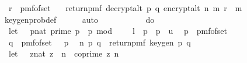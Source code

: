 \begin{isabellebody}
\ \ r\ {\isasymleftarrow}\ pmf{\isacharunderscore}{\kern0pt}of{\isacharunderscore}{\kern0pt}set\ {\isasymZ}{\isacharsemicolon}{\kern0pt}\isanewline
\ \ return{\isacharunderscore}{\kern0pt}pmf\ {\isacharparenleft}{\kern0pt}decrypt{\isacharunderscore}{\kern0pt}alt\ p\ q\ {\isacharparenleft}{\kern0pt}encrypt{\isacharunderscore}{\kern0pt}alt\ n\ m\ r{\isacharparenright}{\kern0pt}\ {\isacharequal}{\kern0pt}\ m{\isacharparenright}{\kern0pt}{\isacharbraceright}{\kern0pt}{\isachardoublequoteclose}\ \isanewline
\ \ \ \ \isamarkupfalse%
\ key{\isacharunderscore}{\kern0pt}gen{\isacharunderscore}{\kern0pt}prob{\isacharunderscore}{\kern0pt}def\isanewline
\ \ \ \ \isamarkupfalse%
\ auto\isanewline
\isanewline
\ \ \isamarkupfalse%
\ \isamarkupfalse%
\ {\isachardoublequoteopen}{\isachardot}{\kern0pt}{\isachardot}{\kern0pt}{\isachardot}{\kern0pt}\ {\isacharequal}{\kern0pt}\ \isanewline
\ \ \ do\ {\isacharbraceleft}{\kern0pt}\isanewline
\ \ let\ {\isasymK}\ {\isacharequal}{\kern0pt}\ {\isacharbraceleft}{\kern0pt}{\isacharparenleft}{\kern0pt}p{\isacharcolon}{\kern0pt}{\isacharcolon}{\kern0pt}nat{\isacharparenright}{\kern0pt}{\isachardot}{\kern0pt}\ prime\ p\ {\isasymand}\ p\ mod\ {}\ {\isacharequal}{\kern0pt}\ {}\ {\isasymand}\ l\ {\isasymle}\ p\ {\isasymand}\ p\ {\isasymle}\ u{\isacharbraceright}{\kern0pt}{\isacharsemicolon}{\kern0pt}\isanewline
\ \ p\ {\isasymleftarrow}\ pmf{\isacharunderscore}{\kern0pt}of{\isacharunderscore}{\kern0pt}set\ {\isasymK}{\isacharsemicolon}{\kern0pt}\ \isanewline
\ \ q\ {\isasymleftarrow}\ pmf{\isacharunderscore}{\kern0pt}of{\isacharunderscore}{\kern0pt}set\ {\isacharparenleft}{\kern0pt}{\isasymK}\ {\isacharminus}{\kern0pt}\ {\isacharbraceleft}{\kern0pt}p{\isacharbraceright}{\kern0pt}{\isacharparenright}{\kern0pt}{\isacharsemicolon}{\kern0pt}\isanewline
\ \ {\isacharparenleft}{\kern0pt}n{\isacharcomma}{\kern0pt}\ {\isacharparenleft}{\kern0pt}p{\isacharcomma}{\kern0pt}\ q{\isacharparenright}{\kern0pt}{\isacharparenright}{\kern0pt}\ {\isasymleftarrow}\ return{\isacharunderscore}{\kern0pt}pmf\ {\isacharparenleft}{\kern0pt}key{\isacharunderscore}{\kern0pt}gen\ p\ q{\isacharparenright}{\kern0pt}{\isacharsemicolon}{\kern0pt}\isanewline
\ \ let\ {\isasymZ}\ {\isacharequal}{\kern0pt}\ {\isacharbraceleft}{\kern0pt}{\isacharparenleft}{\kern0pt}z{\isacharcolon}{\kern0pt}{\isacharcolon}{\kern0pt}nat{\isacharparenright}{\kern0pt}{\isachardot}{\kern0pt}\ z\ {\isacharless}{\kern0pt}\ n\ {\isasymand}\ coprime\ z\ n{\isacharbraceright}{\kern0pt}{\isacharsemicolon}{\kern0pt}\isanewline

\end{isabellebody}
